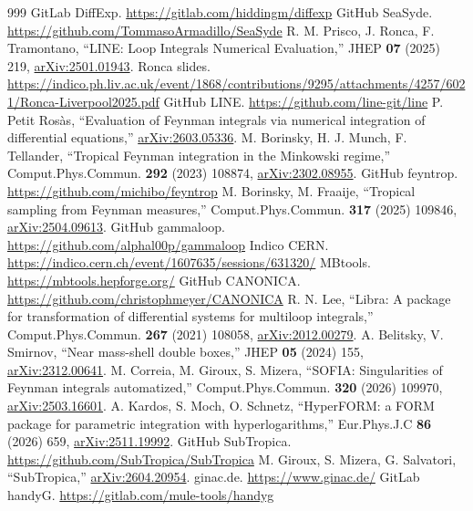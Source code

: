 \documentclass[a4paper,10pt]{ltjsarticle}
\begin{document}
\begin{thebibliography}{999}
 GitLab DiffExp. \url{https://gitlab.com/hiddingm/diffexp}
 GitHub SeaSyde. \url{https://github.com/TommasoArmadillo/SeaSyde}
 R. M. Prisco, J. Ronca, F. Tramontano, ``LINE: Loop Integrals Numerical Evaluation,'' JHEP \textbf{07} (2025) 219, \href{https://arxiv.org/abs/2501.01943}{arXiv:2501.01943}.
 Ronca slides. \url{https://indico.ph.liv.ac.uk/event/1868/contributions/9295/attachments/4257/6021/Ronca-Liverpool2025.pdf}
 GitHub LINE. \url{https://github.com/line-git/line}
 P. Petit Rosàs, ``Evaluation of Feynman integrals via numerical integration of differential equations,'' \href{https://arxiv.org/abs/2603.05336}{arXiv:2603.05336}.
 M. Borinsky, H. J. Munch, F. Tellander, ``Tropical Feynman integration in the Minkowski regime,'' Comput.Phys.Commun. \textbf{292} (2023) 108874, \href{https://arxiv.org/abs/2302.08955}{arXiv:2302.08955}.
 GitHub feyntrop. \url{https://github.com/michibo/feyntrop}
 M. Borinsky, M. Fraaije, ``Tropical sampling from Feynman measures,'' Comput.Phys.Commun. \textbf{317} (2025) 109846, \href{https://arxiv.org/abs/2504.09613}{arXiv:2504.09613}.
 GitHub gammaloop. \url{https://github.com/alphal00p/gammaloop}
 Indico CERN. \url{https://indico.cern.ch/event/1607635/sessions/631320/}
 MBtools. \url{https://mbtools.hepforge.org/}
 GitHub CANONICA. \url{https://github.com/christophmeyer/CANONICA}
 R. N. Lee, ``Libra: A package for transformation of differential systems for multiloop integrals,'' Comput.Phys.Commun. \textbf{267} (2021) 108058, \href{https://arxiv.org/abs/2012.00279}{arXiv:2012.00279}.
 A. Belitsky, V. Smirnov, ``Near mass-shell double boxes,'' JHEP \textbf{05} (2024) 155, \href{https://arxiv.org/abs/2312.00641}{arXiv:2312.00641}.
 M. Correia, M. Giroux, S. Mizera, ``SOFIA: Singularities of Feynman integrals automatized,'' Comput.Phys.Commun. \textbf{320} (2026) 109970, \href{https://arxiv.org/abs/2503.16601}{arXiv:2503.16601}.
 A. Kardos, S. Moch, O. Schnetz, ``HyperFORM: a FORM package for parametric integration with hyperlogarithms,'' Eur.Phys.J.C \textbf{86} (2026) 659, \href{https://arxiv.org/abs/2511.19992}{arXiv:2511.19992}.
 GitHub SubTropica. \url{https://github.com/SubTropica/SubTropica}
 M. Giroux, S. Mizera, G. Salvatori, ``SubTropica,'' \href{https://arxiv.org/abs/2604.20954}{arXiv:2604.20954}.
 ginac.de. \url{https://www.ginac.de/}
 GitLab handyG. \url{https://gitlab.com/mule-tools/handyg}

\end{thebibliography}
\end{document}
